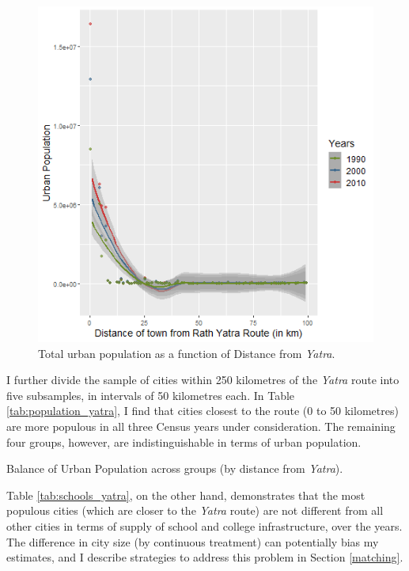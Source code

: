 \documentclass{article}
\begin{document}
\begin{figure}[H]
    \centering
    \includegraphics[scale = 0.7]{images/graph_pop_yatra.png}
    \caption{Total urban population as a function of Distance from \textit{Yatra}.}
    \label{fig:pop_yatra}
\end{figure}

I further divide the sample of cities within 250 kilometres of the \textit{Yatra} route into five subsamples, in intervals of 50 kilometres each. In Table \ref{tab:population_yatra}, I find that cities closest to the route (0 to 50 kilometres) are more populous in all three Census years under consideration. The remaining four groups, however, are indistinguishable in terms of urban population.  

 \begin{table}[H]
    \centering
    \resizebox{\textwidth}{!}{
    
    }
    \caption{Balance of Urban Population across groups (by distance from \textit{Yatra}).}
    \label{tab:population_yatra}
 \end{table}

Table \ref{tab:schools_yatra}, on the other hand, demonstrates that the most populous cities (which are closer to the \textit{Yatra} route) are not different from all other cities in terms of supply of school and college infrastructure, over the years. The difference in city size (by continuous treatment) can potentially bias my estimates, and I describe  strategies to address this problem in Section \ref{matching}. 
\end{document}
